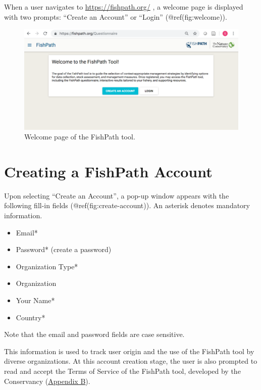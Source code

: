 \documentclass[11pt,]{book}
\providecommand{\tightlist}{%
  \setlength{\itemsep}{0pt}\setlength{\parskip}{0pt}}
\begin{document}
When a user navigates to \url{https://fishpath.org/} , a welcome page is
displayed with two prompts: ``Create an Account'' or ``Login''
(@ref(fig:welcome)).

\begin{figure}

{\centering \includegraphics[width=0.95\linewidth]{images/welcome-page} 

}

\caption{Welcome page of the FishPath tool.}\label{fig:welcome}
\end{figure}

\hypertarget{creating-a-fishpath-account}{%
\section{Creating a FishPath
Account}\label{creating-a-fishpath-account}}

Upon selecting ``Create an Account'', a pop-up window appears with the
following fill-in fields (@ref(fig:create-account)). An asterisk denotes
mandatory information.

\begin{itemize}
\tightlist
\item
  Email*
\item
  Password* (create a password)
\item
  Organization Type*
\item
  Organization
\item
  Your Name*
\item
  Country*
\end{itemize}

Note that the email and password fields are case sensitive.

This information is used to track user origin and the use of the
FishPath tool by diverse organizations. At this account creation stage,
the user is also prompted to read and accept the Terms of Service of the
FishPath tool, developed by the Conservancy
(\protect\hyperlink{terms}{Appendix B}).
\end{document}
